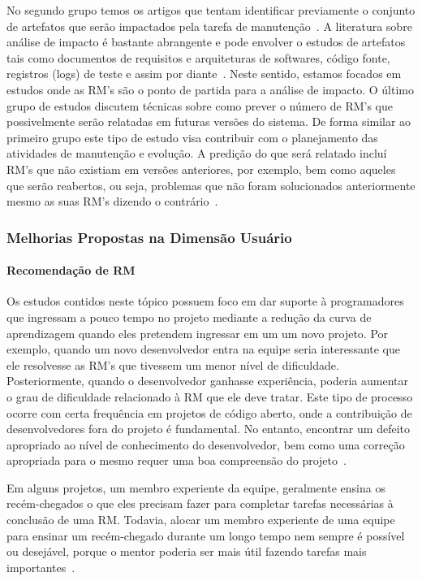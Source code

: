 No segundo grupo temos os artigos que tentam identificar previamente o conjunto
de artefatos que serão impactados pela tarefa de manutenção~\cite{Nagwani2010}.
A literatura sobre análise de impacto é bastante abrangente e pode envolver o
estudos de artefatos tais como documentos de requisitos e arquiteturas de
softwares, código fonte, registros (logs) de teste e assim por
diante~\cite{cavalcanti2014challenges}. Neste sentido, estamos focados em
estudos onde as RM's são o ponto de partida para a análise de impacto. O último
grupo de estudos discutem técnicas sobre como prever o número de RM's que
possivelmente serão relatadas em futuras versões do sistema. De forma similar ao
primeiro grupo este tipo de estudo visa contribuir com o planejamento das
atividades de manutenção e evolução. A predição do que será relatado incluí RM's
que não existiam em versões anteriores, por exemplo, bem como aqueles que serão
reabertos, ou seja, problemas que não foram solucionados anteriormente mesmo as
suas RM's dizendo o contrário~\cite{xia2015automatic}.

\subsubsection{Melhorias Propostas na Dimensão Usuário}
\label{ssub:melhorias_dim_usuario}

\paragraph{Recomendação de RM} Os estudos contidos neste tópico possuem foco em
dar suporte à programadores que ingressam a pouco tempo no projeto mediante a
redução da curva de aprendizagem quando eles pretendem ingressar em um um novo
projeto. Por exemplo, quando um novo desenvolvedor entra na equipe seria
interessante que ele resolvesse as RM's que tivessem um menor nível de
dificuldade. Posteriormente, quando o desenvolvedor ganhasse experiência,
poderia aumentar o grau de dificuldade relacionado à RM que ele deve tratar.
Este tipo de processo ocorre com certa frequência em projetos de código aberto,
onde a contribuição de desenvolvedores fora do projeto é fundamental. No
entanto, encontrar um defeito apropriado ao nível de conhecimento do
desenvolvedor, bem como uma correção apropriada para o mesmo requer uma boa
compreensão do projeto~\cite{Wang2011bug}.

Em alguns projetos, um membro experiente da equipe, geralmente ensina os
recém-chegados o que eles precisam fazer para completar tarefas necessárias à
conclusão de uma RM\@. Todavia, alocar um membro experiente de uma equipe para
ensinar um recém-chegado durante um longo tempo nem sempre é possível ou
desejável, porque o mentor poderia ser mais útil fazendo tarefas mais
importantes~\cite{malheiros2012source}.

